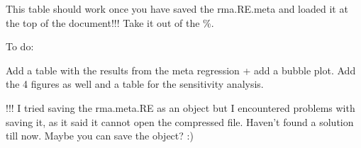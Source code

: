 \documentclass[11pt, a4paper]{article} %
\begin{document}
\begin{table}[ht]
\centering
\caption{Results of the meta-analysis. Includes the the egger's test and the fails-safe number for publication bias testing.} 
{\footnotesize
{}
}
\end{table}\bigskip



This table should work once you have saved the rma.RE.meta and loaded it at the top of the document!!! Take it out of the \%.


\begin{table}[ht]
\centering
\caption{Results of the meta-regression. Test for heterogeneity taking all four continents into account} 
{\footnotesize
{}
}
\end{table}
To do:

Add a table with the results from the meta regression + add a bubble plot. Add the 4 figures as well and a table for the sensitivity analysis. 

!!! I tried saving the rma.meta.RE as an object but I encountered problems with saving it, as it said it cannot open the compressed file. Haven't found a solution till now. Maybe you can save the object? :)
\end{document}
